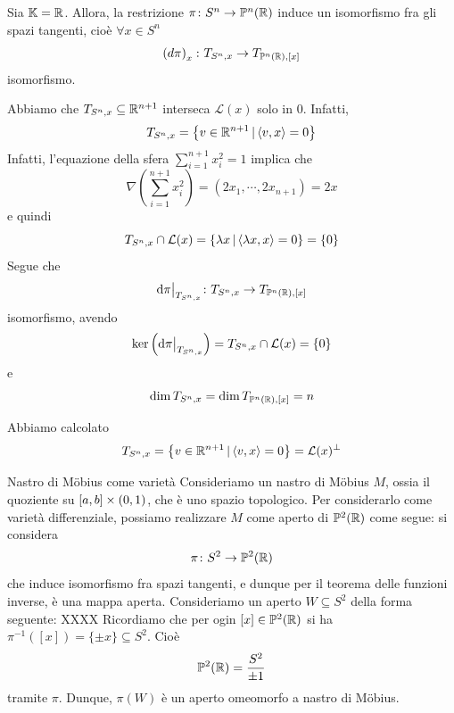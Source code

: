 \documentclass[a4paper]{article}
\begin{document}
\begin{snippetcorollary}{}
    Sia \(\mathbb K = \mathbb{R}\).
    Allora, la restrizione \(\pi \colon S^n \to \mathbb P^n(\mathbb{R})\)
    induce un isomorfismo fra gli spazi tangenti, cioè
    \(\forall x \in S^n\) \[
        \left(d \pi\right)_x \colon T_{S^n, x} \to T_{\mathbb P^n(\mathbb{R}), [x]}
    \]
    isomorfismo.
\end{snippetcorollary}

\begin{snippetproof}{}
    Abbiamo che \(T_{S^n, x} \subseteq \mathbb{R}^{n+1}\) interseca
    \(\mathcal L(x)\) solo in \(0\).
    Infatti, \[
        T_{S^n, x} = \left\{
            v \in \mathbb{R}^{n+1}
            \,|\, \langle v,x\rangle = 0
        \right\}
    \]
    Infatti, l'equazione della sfera \(\sum_{i=1}^{n+1} x_i^2 = 1\)
    implica che
    \[
        \nabla \left(\sum_{i=1}^{n+1} x_i^2\right)
        = (2x_1,\cdots,2x_{n+1}) = 2x
    \]
    e quindi
    \[
        T_{S^n, x} \cap \mathcal L(x) = \left\{
            \lambda x \,|\, \langle \lambda x, x \rangle = 0
        \right\}
        = \{0\}
    \]
    Segue che
    \[
        \restr{\text d\pi}{T_{S^n, x}}
        \colon T_{S^n, x} \fromto T_{\mathbb P^n(\realnumbers), [x]}
    \]
    isomorfismo, avendo \[
        \ker \left(
            \restr{\text d\pi}{T_{S^n,x}}
        \right)
        = T_{S^n,x} \intersection \mathcal L(x) = \{0\}
    \]
    e \[
        \dim T_{S^n,x} = \dim T_{\mathbb P^n(\mathbb{R}),[x]} = n
    \]
\end{snippetproof}

\begin{snippetexample}{}
    Abbiamo calcolato
    \[
        T_{S^n, x} = \left\{
            v \in \mathbb{R}^{n+1} \,|\, \langle v, x \rangle = 0
        \right\} = \mathcal L(x)^\perp
    \]
\end{snippetexample}

\begin{snippetexample}{Nastro di Möbius come varietà}
    Consideriamo un nastro di Möbius \(M\), ossia il quoziente su \([a,b] \times (0,1)\),
    che è uno spazio topologico.
    Per considerarlo come varietà differenziale, possiamo realizzare
    \(M\) come aperto di \(\mathbb P^2(\mathbb{R})\) come segue:
    si considera
    \[
        \pi \colon S^2 \to \mathbb P^2(\mathbb{R})
    \]
    che induce isomorfismo fra spazi tangenti, e dunque
    per il teorema delle funzioni inverse,
    è una mappa aperta. Consideriamo un aperto \(W \subseteq S^2\)
    della forma seguente: XXXX
    Ricordiamo che per ogin \([x] \in \mathbb P^2(\mathbb{R})\)
    si ha \(\pi^{-1}([x]) = \{\pm x\} \subseteq S^2\).
    Cioè
    \[
        \mathbb P^2(\mathbb{R}) = \frac{S^2}{\pm 1}
    \]
    tramite \(\pi\). Dunque,
    \(\pi(W)\) è un aperto omeomorfo a nastro di Möbius.
\end{snippetexample}
\end{document}
